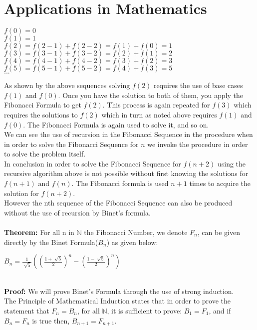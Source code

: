 \documentclass{article}
\begin{document}
\section{Applications in Mathematics}
\begin{center}
$f(0)=0$
\\
$f(1)=1$
\\
$f(2)=f(2-1)+f(2-2)=f(1)+f(0)=1$
\\
$f(3)=f(3-1)+f(3-2)=f(2)+f(1)=2$
\\
$f(4)=f(4-1)+f(4-2)=f(3)+f(2)=3$
\\
$f(5)=f(5-1)+f(5-2)=f(4)+f(3)=5$
\\
$...$
\\
\end{center}
As shown by the above sequences solving $f(2)$ requires the use of base cases $f(1)$ and $f(0)$.  Once you have the solution to both of them, you apply the Fibonacci Formula to get $f(2)$.  This process is again repeated for $f(3)$ which requires the solutions to $f(2)$ which in turn as noted above requires $f(1)$ and $f(0)$.  The Fibonacci Formula is again used to solve it, and so on.  
\\
We can see the use of recursion in the Fibonacci Sequence in the procedure when in order to solve the Fibonacci Sequence for $n$ we invoke the procedure in order to solve the problem itself.   
\\
In conclusion in order to solve the Fibonacci Sequence for $f(n+2)$ using the recursive algorithm above is not possible without first knowing the solutions for $f(n+1)$ and $f(n)$. The Fibonacci formula is used $n+1$ times to acquire the solution for $f(n+2)$.  
\\
However the nth sequence of the Fibonacci Sequence can also be produced without the use of recursion by Binet's formula.
\\
\\
{\bf Theorem:} For all n in $\mathbb{N}$ the Fibonacci Number, we denote $F_n$, can be given directly by the Binet Formula($B_n$) as given below:
\\
\begin{center}
	$B_n=\frac{1}{\sqrt[]{5}}((\frac{1+\sqrt[]{5}}{2})^n-(\frac{1-\sqrt[]{5}}{2})^n)$
\end{center}
~\\
{\bf Proof:} We will prove Binet's Formula through the use of strong induction.
\\
The Principle of Mathematical Induction states that in order to prove the statement that $F_n=B_n$, for all $\mathbb{N}$, it is sufficient to prove: $B_1=F_1$, and if $B_n=F_n$ is true then, $B_{n+1}=F_{n+1}$.  
\end{document}
